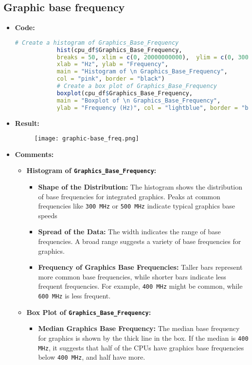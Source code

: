 \documentclass{article}
\begin{document}
	\subsection{Graphic base frequency}
	\begin{itemize}
		\item \textbf{Code:}
		\begin{lstlisting}[basicstyle=\ttfamily, frame=single,language=R]
			# Create a histogram of Graphics_Base_Frequency
			hist(cpu_df$Graphics_Base_Frequency, 
			breaks = 50, xlim = c(0, 20000000000),  ylim = c(0, 3000), 
			xlab = "Hz", ylab = "Frequency", 
			main = "Histogram of \n Graphics_Base_Frequency", 
			col = "pink", border = "black")
			# Create a box plot of Graphics_Base_Frequency
			boxplot(cpu_df$Graphics_Base_Frequency, 
			main = "Boxplot of \n Graphics_Base_Frequency", 
			ylab = "Frequency (Hz)", col = "lightblue", border = "black")
		\end{lstlisting}
		\item \textbf{Result:}
		\begin{figure}[h]
			\centering
			\texttt{[image: graphic-base\_freq.png]}  %
			\label{fig:enter-label}
		\end{figure}
		\item \textbf{Comments:}
		\begin{itemize}
			\item \textbf{Histogram of \texttt{Graphics\_Base\_Frequency}:}
			\begin{itemize}
				\item \textbf{Shape of the Distribution:} The histogram shows the distribution of base frequencies for integrated graphics. Peaks at common frequencies like \texttt{300 MHz} or \texttt{500 MHz} indicate typical graphics base speeds
				\item \textbf{Spread of the Data:} The width indicates the range of base frequencies. A broad range suggests a variety of base frequencies for graphics.
				\item \textbf{Frequency of Graphics Base Frequencies:} Taller bars represent more common base frequencies, while shorter bars indicate less frequent frequencies. For example, \texttt{400 MHz} might be common, while \texttt{600 MHz} is less frequent.
			\end{itemize}
			\item \textbf{Box Plot of \texttt{Graphics\_Base\_Frequency}:}
			\begin{itemize}
				\item \textbf{Median Graphics Base Frequency:} The median base frequency for graphics is shown by the thick line in the box. If the median is \texttt{400 MHz}, it suggests that half of the CPUs have graphics base frequencies below \texttt{400 MHz}, and half have more.

\end{itemize}
\end{itemize}
\end{itemize}
\end{document}

